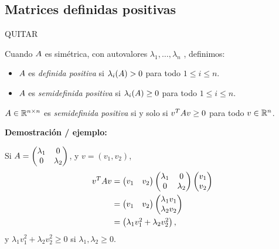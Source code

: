 \subsection{Matrices definidas positivas} 

QUITAR

Cuando $\Ab$ es simétrica, con autovalores $\lambda_1, \dots, \lambda_n$ ,
definimos:

\begin{itemize}
\item   $\Ab$ es \emph{definida positiva} si $\lambda_i(\Ab) > 0$ para todo
    $1 \le i \le n$.
\item  $\Ab$ es \emph{semidefinida positiva} si $\lambda_i(\Ab) \ge 0$ para todo
    $1 \le i \le n$.
\end{itemize}

\begin{prop}

\item   $\Ab \in \R^{n \times n}$ es \emph{semidefinida positiva} si y solo si
    $\vb^T \Ab \vb \ge 0$ para todo $\vb \in \R^n$.

\textbf{Demostración / ejemplo:}

Si $\Ab = \begin{pmatrix} \lambda_1 & 0 \\ 0 & \lambda_2 \end{pmatrix}$, y
$v = (v_1, v_2)$,
$$ \begin{aligned} \vb^T \Ab \vb &=
\begin{pmatrix} v_1 & v_2 \end{pmatrix} \begin{pmatrix} \lambda_1 & 0 \\ 0 & \lambda_2 \end{pmatrix} \begin{pmatrix} v_1 \\ v_2 \end{pmatrix} \\
&= \begin{pmatrix} v_1 & v_2 \end{pmatrix} \begin{pmatrix} \lambda_1 v_1 \\ \lambda_2 v_2\end{pmatrix} \\
&= \begin{pmatrix} \lambda_1 v_1^2 + \lambda_2 v_2^2 \end{pmatrix},
\end{aligned}$$
y $\lambda_1 v_1^2 + \lambda_2 v_2^2 \ge 0$ si
$\lambda_1, \lambda_2 \ge 0$.

\end{prop}

